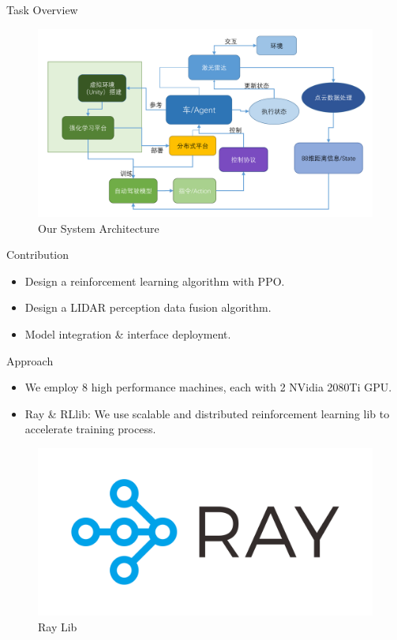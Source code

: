\documentclass[final,dvipsnames]{beamer}
\begin{document}
\begin{frame}[t, fragile = singleslide]{}
\begin{columns}[t]
\begin{column}{0.3\textwidth}
\begin{block}{Task Overview}
  \begin{figure}[ht]
    \centering
    \includegraphics[width = \columnwidth]{./assets/system.jpeg}
    \caption{Our System Architecture}
    \label{fig:label}
  \end{figure}
\end{block}

\begin{block}{Contribution}
  \begin{itemize}
    \item Design a reinforcement learning algorithm with PPO.
    \item Design a LIDAR perception data fusion algorithm.
    \item Model integration \& interface deployment.
  \end{itemize}
\end{block}

\begin{block}{Approach}

  \begin{subblock}
  \begin{itemize}
    \item We employ 8 high performance machines, each with 2 NVidia 2080Ti GPU.
    \item Ray \& RLlib: We use scalable and distributed reinforcement learning lib to accelerate training process.
  \end{itemize}
  \begin{figure}[ht]
    \centering
    \includegraphics[width = 0.6\columnwidth]{./assets/ray_logo.png}
    \caption{Ray Lib}
    \label{fig:label}
  \end{figure}
  \end{subblock}


\end{block}
\end{column}
\end{columns}
\end{frame}
\end{document}
